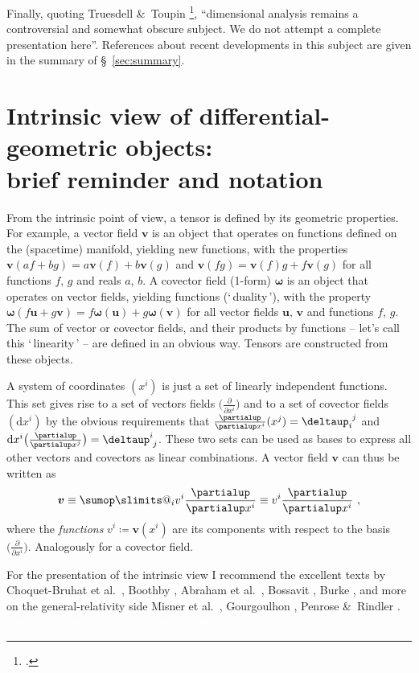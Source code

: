 \documentclass[\ifafour a4paper,12pt,\else a5paper,10pt,\fi%
onecolumn,oneside,article,%
british%
]{memoir}
\makeatletter
\newcommand*{\defquote}[1]{`\,#1\,'}
\theoremstyle{remark}
\theoremstyle{innote}
\def\sum{\DOTSI\sumop\slimits@}
\newcommand*{\citep}{\footcites}
\newcommand*{\citey}{\parencites*}%
\newcommand*{\amp}{\&}
\newcommand*{\de}{\partialup}%
\newcommand*{\delt}{\deltaup}%
\newcommand*{\di}{\mathrm{d}}%
\newcommand*{\defd}{\coloneqq}
\newcommand*{\dotv}{\mathord{\,\cdot\,}}%
\renewcommand*{\|}[1][]{\nonscript\,#1\vert\nonscript\;\mathopen{}}
\newcommand*{\sect}{\S}%
\newcommand*{\chap}{ch.}%
\newcommand*{\etal}{{et al.}}
\newcommand*{\yom}{\bm{\omega}}
\newcommand*{\yv}{\bm{v}}
\newcommand*{\yu}{\bm{u}}
\renewcommand*{\i}{\indices}
\newcommand*{\dex}[1][i]{\frac{\de}{\de x^{#1}}}
\newcommand*{\dix}[1][i]{\di x^{#1}}
\makeatother
\begin{document}
Finally, quoting Truesdell \amp\ Toupin \citep[Appendix \sect~7
footnote~4]{truesdelletal1960}, \enquote{dimensional analysis remains a
  controversial and somewhat obscure subject. We do not attempt a complete
  presentation here}. References about recent developments in this subject
are given in the summary of \sect~\ref{sec:summary}.




\section{Intrinsic view of differential-geometric objects:\\ brief
  reminder and notation}
\label{sec:remined}


From the intrinsic point of view, a tensor is defined by its geometric
properties. For example, a vector field $\yv$ %
is an object that operates on functions defined on the (spacetime)
manifold, yielding new functions, with the properties
$\yv(af+bg)=a\yv(f)+b\yv(g)$ and $\yv(fg)=\yv(f)g+f\yv(g)$ for all
functions $f$, $g$ and reals $a$, $b$. A covector field (1-form) $\yom$ is
an object that operates on vector fields, yielding functions
(\defquote{duality}), with the property
$\yom(f\yu+g\yv)=f\yom(\yu)+g\yom(\yv)$ for all vector fields $\yu$, $\yv$
and functions $f$, $g$. The sum of vector or covector fields, and their
products by functions -- let's call this \defquote{linearity} -- are
defined in an obvious way. Tensors are constructed from these objects.

A system of coordinates $(x^{i})$ is just a set of linearly independent
functions. This set gives rise to a set of vectors fields
$\bigl(\dex\bigr)$ and to a set of covector fields $(\dix)$ by the obvious
requirements that $\dex(x^{j})=\delt\i{_{i}^{j}}$ and
$\dix\bigl(\dex[j]\bigr)=\delt\i{^{i}_{j}}$. These two sets can be used as bases
to express all other vectors and covectors as linear combinations. A
vector field $\yv$ can thus be written as
\begin{equation}
  \label{eq:vector_intrinsic}
  \yv \equiv \sum_{i}v^{i}\dex \equiv v^{i}\dex \ ,
\end{equation}
where the \emph{functions} $v^{i}\defd \yv(x^{i})$ are its components with
respect to the basis $\bigl(\dex\bigr)$. Analogously for a covector field.

\medskip

For the presentation of the intrinsic view I recommend the excellent texts
by Choquet-Bruhat \etal\ \citey{choquetbruhatetal1977_r1996}, Boothby
\citey{boothby1975_r2003}, Abraham \etal\ \citey{abrahametal1983_r1988},
Bossavit \citey{bossavit1991}, Burke
\citey{burke1985_r1987}[\chap~2]{burke1980b}, and more on the
general-relativity side Misner \etal\
\citey[\chap~9]{misneretal1970_r1973}, Gourgoulhon
\citey[\chap~2]{gourgoulhon2007_r2012}, Penrose \amp\ Rindler
\citey[\chap~4]{penroseetal1984_r2003}. \textcolor{white}{If you find this
  you can claim a postcard from me.}
\end{document}
